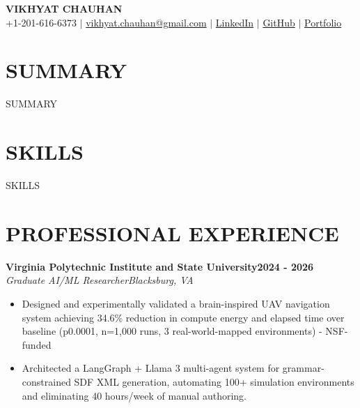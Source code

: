 \documentclass[letterpaper,10pt]{article}
\newcommand{\experience}[4]{%
  \noindent\textbf{#1}\hfill\textbf{#2}\\
  \textit{#3}\hfill\textit{#4}\par\vspace{-2pt}
}
\begin{document}
\begin{center}
    {\huge\bfseries VIKHYAT CHAUHAN}\\[4pt]
    +1-201-616-6373 $\mid$ \href{mailto:vikhyat.chauhan@gmail.com}{vikhyat.chauhan@gmail.com} $\mid$ \href{https://linkedin.com/in/vikhyat-chauhan}{LinkedIn} $\mid$ \href{https://github.com/vikhyat-chauhan}{GitHub} $\mid$ \href{https://vikhyatchauhan.com/?ref=resume051626c}{Portfolio}
\end{center}

\section*{SUMMARY}
{{SUMMARY}}

\section*{SKILLS}
{{SKILLS}}

\section*{PROFESSIONAL EXPERIENCE}

\experience{Virginia Polytechnic Institute and State University}{2024 - 2026}{Graduate AI/ML Researcher}{Blacksburg, VA}
\begin{itemize}
    \item Designed and experimentally validated a brain-inspired UAV navigation system achieving 34.6\% reduction in compute energy and elapsed time over baseline (p0.0001, n=1,000 runs, 3 real-world-mapped environments) - NSF-funded
    \item Architected a LangGraph + Llama 3 multi-agent system for grammar-constrained SDF XML generation, automating 100+ simulation environments and eliminating 40 hours/week of manual authoring.
\end{itemize}
\end{document}
